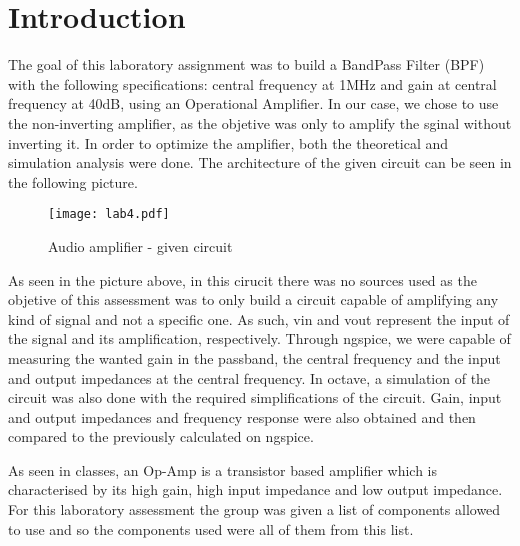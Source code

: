 \section{Introduction}
\label{sec:introduction}

\par The goal of this laboratory assignment was to build a BandPass Filter (BPF) with the following specifications: central frequency at 1MHz and gain at central frequency at 40dB, using an Operational Amplifier. In our case, we chose to use the non-inverting amplifier, as the objetive was only to amplify the sginal without inverting it. In order to optimize the amplifier, both the theoretical and simulation analysis were done. The architecture of the given circuit can be seen in the following picture.

\begin{figure}[H] \centering
	\texttt{[image: lab4.pdf]}
	\caption{Audio amplifier - given circuit}
	\label{fig:1}
	
\end{figure}

\par As seen in the picture above, in this cirucit there was no sources used as the objetive of this assessment was to only build a circuit capable of amplifying any kind of signal and not a specific one. As such, vin and vout represent the input of the signal and its amplification, respectively. Through ngspice,  we were capable of measuring the wanted gain in the passband, the central frequency and the input and output impedances at the central frequency. In octave, a simulation of the circuit was also done with the required simplifications of the circuit. Gain, input and output impedances and frequency response were also obtained and then compared to the previously calculated on ngspice.

\par As seen in classes, an Op-Amp is a transistor based amplifier which is characterised by its high gain, high input impedance and low output impedance. For this laboratory assessment the group was given a list of components allowed to use and so the components used were all of them from this list.

\newpage
